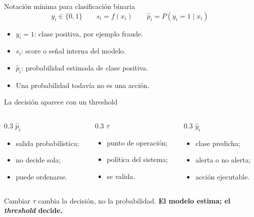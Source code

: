 \documentclass[aspectratio=169,12pt]{beamer}
\begin{document}
\begin{frame}{Notación mínima para clasificación binaria}
  \large\[
    y_i \in \{0, 1\} \qquad s_i = f(x_i) \qquad \hat{p}_i = P(y_i = 1 \mid x_i)
  \]
  \normalsize
  \begin{itemize}\large
    \item $y_i = 1$: clase positiva, por ejemplo fraude.
    \item $s_i$: score o señal interna del modelo.
    \item $\hat{p}_i$: probabilidad estimada de clase positiva.
    \item Una probabilidad todavía no es una acción.
  \end{itemize}
\end{frame}

\begin{frame}{La decisión aparece con un threshold}
  \relax{\large\[ \hat{y}_i(\tau) = \mathbf{1}\left[\hat{p}_i \geq \tau\right] \]}
  \begin{columns}[T]
    \begin{column}{0.3\textwidth}
      $\hat{p}_i$
      \begin{itemize}
        \item salida probabilística;
        \item no decide sola;
        \item puede ordenarse.
      \end{itemize}
    \end{column}
    \begin{column}{0.3\textwidth}
      $\tau$
      \begin{itemize}
        \item punto de operación;
        \item política del sistema;
        \item se valida.
      \end{itemize}
    \end{column}
    \begin{column}{0.3\textwidth}
      $\hat{y}_i$
      \begin{itemize}
        \item clase predicha;
        \item alerta o no alerta;
        \item acción ejecutable.
      \end{itemize}
    \end{column}
  \end{columns}
  \vspace{8pt}
  \begin{center}
    Cambiar $\tau$ cambia la decisión, no la probabilidad. \textbf{El modelo estima; el \emph{threshold} decide.}
  \end{center}
\end{frame}
\end{document}
